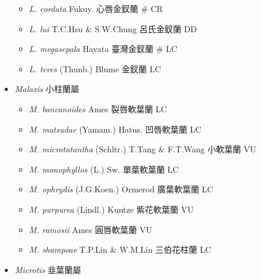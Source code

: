 \begin{itemize}
  \begin{itemize}
        \item[] \textit{L. cordata} Fukuy.  心唇金釵蘭  \# CR
        \item[] \textit{L. lui} T.C.Hsu \& S.W.Chung  呂氏金釵蘭   DD
        \item[] \textit{L. megasepala} Hayata  臺灣金釵蘭  \# LC
        \item[] \textit{L. teres} (Thunb.) Blume  金釵蘭   LC
  \end{itemize}
 \item[] \textit{Malaxis} 小柱蘭屬
                                
  \begin{itemize}
        \item[] \textit{M. bancanoides} Ames  裂唇軟葉蘭   LC
        \item[] \textit{M. matsudae} (Yamam.) Hatus.  凹唇軟葉蘭   LC
        \item[] \textit{M. microtatantha} (Schltr.) T.Tang \& F.T.Wang  小軟葉蘭   VU
        \item[] \textit{M. monophyllos} (L.) Sw.  單葉軟葉蘭   LC
        \item[] \textit{M. ophrydis} (J.G.Koen.) Ormerod  廣葉軟葉蘭   LC
        \item[] \textit{M. purpurea} (Lindl.) Kuntze  紫花軟葉蘭   VU
        \item[] \textit{M. ramosii} Ames  圓唇軟葉蘭   VU
        \item[] \textit{M. shampoae} T.P.Lin \& W.M.Lin  三伯花柱蘭   LC
  \end{itemize}
 \item[] \textit{Microtis} 韭葉蘭屬
                                

\end{itemize}
